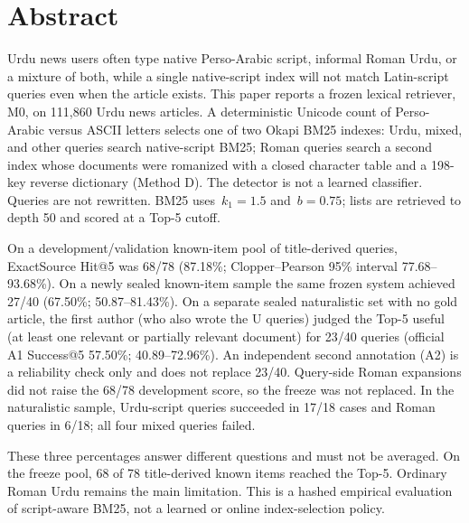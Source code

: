 \documentclass[10pt,letterpaper]{article}
\begin{document}
%
\section*{Abstract}
Urdu news users often type native Perso-Arabic script, informal Roman Urdu, or a mixture of both, while a single native-script index will not match Latin-script queries even when the article exists. This paper reports a frozen lexical retriever, M0, on 111,860 Urdu news articles. A deterministic Unicode count of Perso-Arabic versus ASCII letters selects one of two Okapi BM25 indexes: Urdu, mixed, and other queries search native-script BM25; Roman queries search a second index whose documents were romanized with a closed character table and a 198-key reverse dictionary (Method D). The detector is not a learned classifier. Queries are not rewritten. BM25 uses~$k_1 = 1.5$ and~$b = 0.75$; lists are retrieved to depth 50 and scored at a Top-5 cutoff.

On a development/validation known-item pool of title-derived queries, ExactSource Hit@5 was 68/78 (87.18\%; Clopper--Pearson 95\% interval 77.68--93.68\%). On a newly sealed known-item sample the same frozen system achieved 27/40 (67.50\%; 50.87--81.43\%). On a separate sealed naturalistic set with no gold article, the first author (who also wrote the U queries) judged the Top-5 useful (at least one relevant or partially relevant document) for 23/40 queries (official A1 Success@5 57.50\%; 40.89--72.96\%). An independent second annotation (A2) is a reliability check only and does not replace 23/40. Query-side Roman expansions did not raise the 68/78 development score, so the freeze was not replaced. In the naturalistic sample, Urdu-script queries succeeded in 17/18 cases and Roman queries in 6/18; all four mixed queries failed.

These three percentages answer different questions and must not be averaged. On the freeze pool, 68 of 78 title-derived known items reached the Top-5. Ordinary Roman Urdu remains the main limitation. This is a hashed empirical evaluation of script-aware BM25, not a learned or online index-selection policy.

\end{document}
